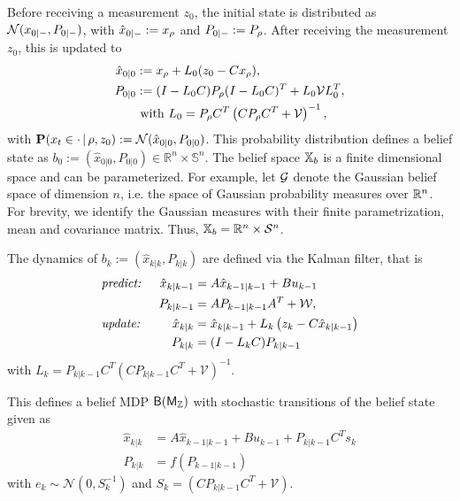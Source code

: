 \documentclass{ifacconf}
\begin{document}
 
Before receiving a measurement $z_0$, the initial state is distributed  as $\mathcal{N}(x_{0|-}, P_{0|-})$, 	with $\hat x_{0|-}:= x_\rho$ and $P_{0|-}:= P_{\rho}$.
After receiving the measurement $z_0$, this is updated to \begin{align*}
	\hat x_{0|0}&:= x_\rho+ L_0 (z_0-Cx_\rho),\\
	P_{0|0}&:=(I-L_0 C) P_{\rho}(I-L_0 C)^T+L_0\mathcal{V} L_0^T,\\
	& \mbox{ with } L_0=P_{\rho}C^T\left(CP_{\rho}C^T+\mathcal V\right)^{-1},
\end{align*}
with $\mathbf{P}(x_t\in \cdot\,|\,\rho,z_0):=\mathcal{N}(\hat x_{0|0}, P_{0|0})$.
This probability distribution defines a belief state as $b_0:=(\hat x_{0|0}, P_{0|0})\in\mathbb R^n\times \mathbb S^n$. The belief space ${{\mathbb{X}}_b}$ is  a finite dimensional space and can be parameterized. For example, let $\mathcal{G}$ denote the Gaussian belief space
    of dimension $n$, i.e. the space of Gaussian
    probability measures over $\mathbb{R}^n$.
    For brevity, we identify the Gaussian measures
    with their finite parametrization, mean and
    covariance matrix.
     Thus,
    ${{\mathbb{X}}_b} =  \mathbb{R}^n \times  \mathcal S^n$.


The dynamics of  $b_k:=(\hat x_{k|k}, P_{k|k})$ are defined via the 
 Kalman filter, that is
	\begin{align*}
	&\text{\it predict: }&\hat x_{k|k-1}&=A\hat x_{k-1|k-1}+Bu_{k-1} \\
	&&P_{k|k-1}&=AP_{k-1|k-1}A^T+\mathcal W,
\\
	&\text{\it update: }&\hat x_{k|k}&=\hat x_{k|k-1}+L_k\left(z_k-C \hat x_{k|k-1}\right)\\
	&&P_{k|k}&=(I-L_kC)P_{k|k-1}
	\end{align*}
	with  $L_{k}=P_{k|k-1}C^T\left(CP_{k|k-1}C^T+\mathcal V\right)^{-1}$.
 
This defines a belief MDP $\mathsf{B}{(\mathsf{M}_{{\mathbb{Z}}})}$ with stochastic transitions of the belief state given as 
\begin{align}
	&&\hat x_{k|k}&=A\hat x_{k-1|k-1}+Bu_{k-1}+P_{k|k-1}C^Ts_k\label{eq:beliefx}\\
	&&P_{k|k}&=f(P_{k-1|k-1})
\end{align}
with $e_k\sim \mathcal N (0, S_k^{-1})$ and  $S_k=\left(CP_{k|k-1}C^T+\mathcal V\right)$.
\end{document}
